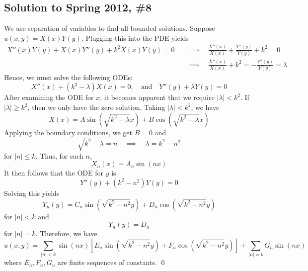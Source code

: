 \subsection*{Solution to Spring 2012, \#8}\label{s128}
We use separation of variables to find all bounded solutions. Suppose $u(x,y) = X(x)Y(y)$. Plugging this into the PDE yields
\begin{align*}
	 X''(x)Y(y) + X(x)Y''(y) + k^2 X(x)Y(y) = 0 \quad &\implies \quad \frac{X''(x)}{X(x)} + \frac{Y''(y)}{Y(y)} + k^2 = 0 \\
	 &\implies \quad  \frac{X''(x)}{X(x)} + k^2 = -  \frac{Y''(y)}{Y(y)} = \lambda
\end{align*}
Hence, we must solve the following ODEs:
$$ X''(x) + (k^2 - \lambda) X(x) = 0, \quad \text{and} \quad Y''(y) + \lambda Y(y) = 0 $$
After examining the ODE for $x$, it becomes apparent that we require $|\lambda| < k^2$. If $|\lambda| \geq k^2$, then we only have the zero solution. Taking $|\lambda| < k^2$, we have
$$ X(x) = A \sin(\sqrt{k^2 - \lambda} x) + B \cos (\sqrt{k^2 - \lambda} x) $$
Applying the boundary conditions, we get $B = 0$ and
$$ \sqrt{k^2 - \lambda} = n \quad \implies \quad \lambda = k^2 - n^2 $$
for $|n| \leq  k$. Thus, for such $n$,
$$ X_n(x) = A_n \sin (nx) $$
It then follows that the ODE for $y$ is
$$ Y''(y) + (k^2 - n^2) Y(y) = 0 $$
Solving this yields
$$ Y_n(y) = C_n \sin (\sqrt{k^2 - n^2} y) + D_n \cos( \sqrt{k^2 - n^2} y) $$
for $|n| < k$ and
$$ Y_n(y) = D_n $$
for $|n| = k$. Therefore, we have
$$ u(x,y) = \sum_{|n| < k} \sin(nx) \left[ E_n \sin(\sqrt{k^2-n^2} y) + F_n \cos(\sqrt{k^2-n^2} y) \right] + \sum_{|n| = k} G_n \sin(nx) $$
where $E_n, F_n, G_n$ are finite sequences of constants. \qed
